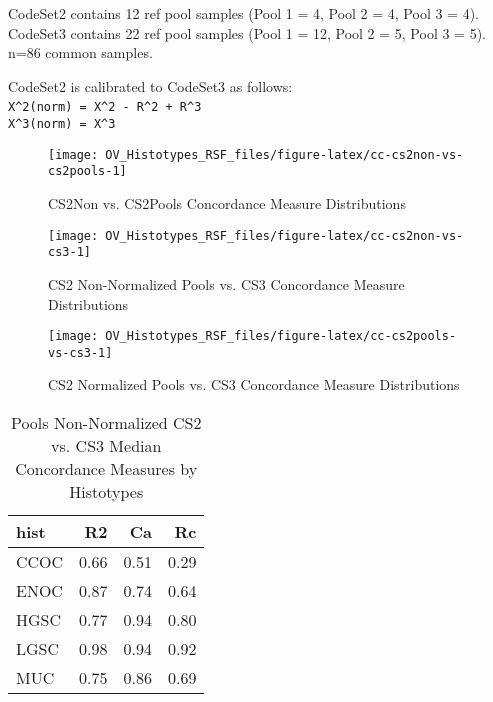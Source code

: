 \documentclass[
]{report}
\begin{document}
CodeSet2 contains 12 ref pool samples (Pool 1 = 4, Pool 2 = 4, Pool 3 = 4). CodeSet3 contains 22 ref pool samples (Pool 1 = 12, Pool 2 = 5, Pool 3 = 5). n=86 common samples.

CodeSet2 is calibrated to CodeSet3 as follows:\\
\texttt{X\^{}2(norm)\ =\ X\^{}2\ -\ R\^{}2\ +\ R\^{}3}~\\
\texttt{X\^{}3(norm)\ =\ X\^{}3}

\begin{figure}[H]

{\centering \texttt{[image: OV\_Histotypes\_RSF\_files/figure-latex/cc-cs2non-vs-cs2pools-1]} 

}

\caption{CS2Non vs. CS2Pools Concordance Measure Distributions}\label{fig:cc-cs2non-vs-cs2pools}
\end{figure}

\begin{figure}[H]

{\centering \texttt{[image: OV\_Histotypes\_RSF\_files/figure-latex/cc-cs2non-vs-cs3-1]} 

}

\caption{CS2 Non-Normalized Pools vs. CS3 Concordance Measure Distributions}\label{fig:cc-cs2non-vs-cs3}
\end{figure}

\begin{figure}[H]

{\centering \texttt{[image: OV\_Histotypes\_RSF\_files/figure-latex/cc-cs2pools-vs-cs3-1]} 

}

\caption{CS2 Normalized Pools vs. CS3 Concordance Measure Distributions}\label{fig:cc-cs2pools-vs-cs3}
\end{figure}

\begin{table}

\caption{\label{tab:pools-cs2non-vs-cs3}Pools Non-Normalized CS2 vs. CS3 Median Concordance Measures by Histotypes}
\centering
\begin{tabular}[t]{l|r|r|r}
\hline
hist & R2 & Ca & Rc\\
\hline
CCOC & 0.66 & 0.51 & 0.29\\
\hline
ENOC & 0.87 & 0.74 & 0.64\\
\hline
HGSC & 0.77 & 0.94 & 0.80\\
\hline
LGSC & 0.98 & 0.94 & 0.92\\
\hline
MUC & 0.75 & 0.86 & 0.69\\
\hline
\end{tabular}
\end{table}
\end{document}
